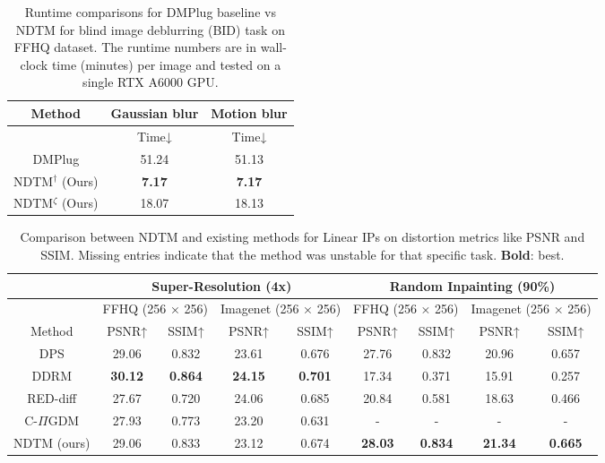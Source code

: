 \begin{table}[t]
\caption{Runtime comparisons for DMPlug baseline vs NDTM for blind image deblurring (BID) task on FFHQ dataset. The runtime numbers are in wall-clock time (minutes) per image and tested on a single RTX A6000 GPU.}
\label{table:bid_runtime}
\small
\centering
\begin{tabular}{@{}ccc@{}}
\toprule
Method                     & \multicolumn{1}{c|}{Gaussian blur} & Motion blur \\ \midrule
                           & Time↓                              & Time↓       \\ \midrule
DMPlug                     & 51.24                              & 51.13       \\ \midrule
NDTM$^\dagger$ (Ours) & \textbf{7.17}                       & \textbf{7.17} \\ 
NDTM$^\zeta$ (Ours) & 18.07                               & 18.13       \\ \bottomrule
\end{tabular}
\end{table}


\begin{table}[ht]
\caption{Comparison between NDTM and existing methods for Linear IPs on distortion metrics like PSNR and SSIM. Missing entries indicate that the method was unstable for that specific task. \textbf{Bold}: best.}
\small
\centering
\begin{tabular}{@{}c|cc|cc|cc|cc@{}}
\toprule
\multicolumn{1}{c|}{} & \multicolumn{4}{c|}{\textbf{Super-Resolution (4x)}} & \multicolumn{4}{c}{\textbf{Random Inpainting (90\%)}} \\ \midrule
 & \multicolumn{2}{c|}{FFHQ (256 × 256)} & \multicolumn{2}{c|}{Imagenet (256 × 256)} & \multicolumn{2}{c|}{FFHQ (256 × 256)} & \multicolumn{2}{c}{Imagenet (256 × 256)} \\ \midrule
Method & PSNR↑ & SSIM↑ & PSNR↑ & SSIM↑ & PSNR↑ & SSIM↑ & PSNR↑ & SSIM↑ \\ \midrule
DPS & 29.06 & 0.832 & 23.61 & 0.676 & 27.76 & 0.832 & 20.96 & 0.657 \\
DDRM & \textbf{30.12} & \textbf{0.864} & \textbf{24.15} & \textbf{0.701} & 17.34 & 0.371 & 15.91 & 0.257 \\
RED-diff & 27.67 & 0.720 & 24.06 & 0.685 & 20.84 & 0.581 & 18.63 & 0.466 \\
C-$\Pi$GDM & 27.93 & 0.773 & 23.20 & 0.631 & - & - & - & - \\ \midrule
NDTM (ours) & 29.06 & 0.833 & 23.12 & 0.674 & \textbf{28.03} & \textbf{0.834} & \textbf{21.34} & \textbf{0.665} \\ \bottomrule
\end{tabular}
\label{table:recovery_linear_ip}
\end{table}

